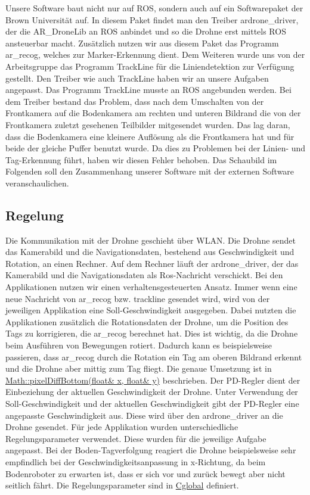 Unsere Software baut nicht nur auf ROS, sondern auch auf ein Softwarepaket der Brown Universität auf. In diesem Paket findet man den Treiber ardrone\_\-driver, der die AR\_\-DroneLib an ROS anbindet und so die Drohne erst mittels ROS ansteuerbar macht. Zusätzlich nutzen wir aus diesem Paket das Programm ar\_\-recog, welches zur Marker-\/Erkennung dient. Dem Weiteren wurde uns von der Arbeitsgruppe das Programm TrackLine für die Liniendetektion zur Verfügung gestellt. Den Treiber wie auch TrackLine haben wir an unsere Aufgaben angepasst. Das Programm TrackLine musste an ROS angebunden werden. Bei dem Treiber bestand das Problem, dass nach dem Umschalten von der Frontkamera auf die Bodenkamera am rechten und unteren Bildrand die von der Frontkamera zuletzt gesehenen Teilbilder mitgesendet wurden. Das lag daran, dass die Bodenkamera eine kleinere Auflösung als die Frontkamera hat und für beide der gleiche Puffer benutzt wurde. Da dies zu Problemen bei der Linien-\/ und Tag-\/Erkennung führt, haben wir diesen Fehler behoben. Das Schaubild im Folgenden soll den Zusammenhang unserer Software mit der externen Software veranschaulichen.



\subsection*{Regelung}

Die Kommunikation mit der Drohne geschieht über WLAN. Die Drohne sendet das Kamerabild und die Navigationsdaten, bestehend aus Geschwindigkeit und Rotation, an einen Rechner. Auf dem Rechner läuft der ardrone\_\-driver, der das Kamerabild und die Navigationsdaten als Ros-\/Nachricht verschickt. Bei den Applikationen nutzen wir einen verhaltensgesteuerten Ansatz. Immer wenn eine neue Nachricht von ar\_\-recog bzw. trackline gesendet wird, wird von der jeweiligen Applikation eine Soll-\/Geschwindigkeit ausgegeben. Dabei nutzten die Applikationen zusätzlich die Rotationsdaten der Drohne, um die Position des Tags zu korrigieren, die ar\_\-recog berechnet hat. Dies ist wichtig, da die Drohne beim Ausführen von Bewegungen rotiert. Dadurch kann es beispielsweise passieren, dass ar\_\-recog durch die Rotation ein Tag am oberen Bildrand erkennt und die Drohne aber mittig zum Tag fliegt. Die genaue Umsetzung ist in \hyperlink{namespace_math_a25b9284eb485b732c952786b63343aaa}{Math::pixelDiffBottom(float\& x, float\& y)} beschrieben. Der PD-\/Regler dient der Einbeziehung der aktuellen Geschwindigkeit der Drohne. Unter Verwendung der Soll-\/Geschwindigkeit und der aktuellen Geschwindigkeit gibt der PD-\/Regler eine angepasste Geschwindigkeit aus. Diese wird über den ardrone\_\-driver an die Drohne gesendet. Für jede Applikation wurden unterschiedliche Regelungsparameter verwendet. Diese wurden für die jeweilige Aufgabe angepasst. Bei der Boden-\/Tagverfolgung reagiert die Drohne beispielsweise sehr empfindlich bei der Geschwindigkeitsanpassung in x-\/Richtung, da beim Bodenroboter zu erwarten ist, dass er sich vor und zurück bewegt aber nicht seitlich fährt. Die Regelungsparameter sind in \hyperlink{class_cglobal}{Cglobal} definiert.



